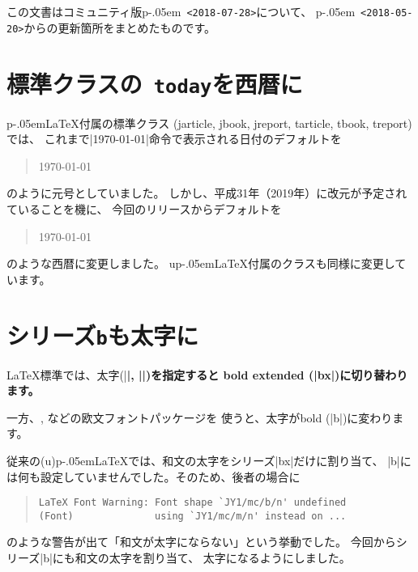 \documentclass{plnews}
\author{日本語\TeX{}開発コミュニティ（\texttt{https://texjp.org/}）}
\def\cs#1{\texttt{\char92 #1}}
\def\pLaTeX{p\kern-.05em\LaTeX}
\def\pLaTeXe{p\kern-.05em\LaTeXe}
\begin{document}
\maketitle

この文書はコミュニティ版\pLaTeXe\ \texttt{<2018-07-28>}について、
\pLaTeXe\ \texttt{<2018-05-20>}からの更新箇所をまとめたものです。


\section{標準クラスの\cs{today}を西暦に}
\pLaTeX{}付属の標準クラス
(jarticle, jbook, jreport, tarticle, tbook, treport)では、
これまで|\today|命令で表示される日付のデフォルトを
\begin{quote}
\today
\end{quote}
のように元号としていました。
しかし、平成31年（2019年）に改元が予定されていることを機に、
今回のリリースからデフォルトを
\begin{quote}
\today
\end{quote}
のような西暦に変更しました。
u\pLaTeX{}付属のクラスも同様に変更しています。


\section{シリーズ\texttt{b}も太字に}
\LaTeX{}標準では、太字(|\bfseries|, |\textbf|)を指定すると
{\selectfont bold extended} (|bx|)に切り替わります。

一方、, などの欧文フォントパッケージを
使うと、太字が{\selectfont bold} (|b|)に変わります。

従来の(u)\pLaTeX{}では、和文の太字をシリーズ|bx|だけに割り当て、
|b|には何も設定していませんでした。そのため、後者の場合に
\begin{quote}\scriptsize
\begin{verbatim}
LaTeX Font Warning: Font shape `JY1/mc/b/n' undefined
(Font)              using `JY1/mc/m/n' instead on ...
\end{verbatim}
\end{quote}
のような警告が出て「和文が太字にならない」という挙動でした。
今回からシリーズ|b|にも和文の太字を割り当て、
太字になるようにしました。
\end{document}
